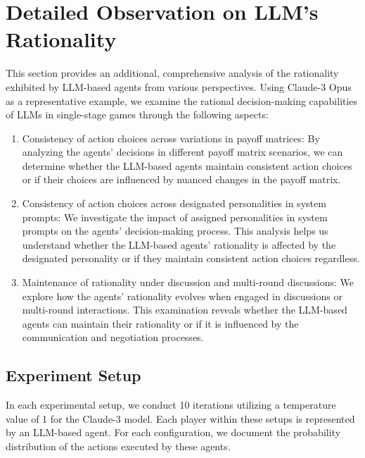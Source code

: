 \section{Detailed Observation on LLM's Rationality}
\label{sec:observation}
This section provides an additional, comprehensive analysis of the rationality exhibited by LLM-based agents from various perspectives. Using Claude-3 Opus as a representative example, we examine the rational decision-making capabilities of LLMs in single-stage games through the following aspects:

\begin{enumerate}
    \item Consistency of action choices across variations in payoff matrices: By analyzing the agents' decisions in different payoff matrix scenarios, we can determine whether the LLM-based agents maintain consistent action choices or if their choices are influenced by nuanced changes in the payoff matrix.
    \item Consistency of action choices across designated personalities in system prompts: We investigate the impact of assigned personalities in system prompts on the agents' decision-making process. This analysis helps us understand whether the LLM-based agents' rationality is affected by the designated personality or if they maintain consistent action choices regardless.
    \item Maintenance of rationality under discussion and multi-round discussions: We explore how the agents' rationality evolves when engaged in discussions or multi-round interactions. This examination reveals whether the LLM-based agents can maintain their rationality or if it is influenced by the communication and negotiation processes.
\end{enumerate}

\subsection{Experiment Setup}
In each experimental setup, we conduct 10 iterations utilizing a temperature value of 1 for the Claude-3 model. Each player within these setups is represented by an LLM-based agent. For each configuration, we document the probability distribution of the actions executed by these agents.

